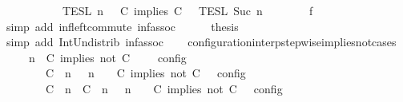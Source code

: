 \begin{isabellebody}
\ \ \ \ \ \ \ \ {\isasyminter}\ {\isacharparenleft}{\isasymlbrakk}{\isasymlbrakk}\ {\isasymPsi}\ {\isasymrbrakk}{\isasymrbrakk}\isactrlsub T\isactrlsub E\isactrlsub S\isactrlsub L\isactrlbsup {\isasymge}\ n\isactrlesup \ {\isasyminter}\ {\isasymlbrakk}{\isasymlbrakk}\ {\isacharparenleft}C\ implies\ C\ {\isacharhash}\ {\isasymPhi}\ {\isasymrbrakk}{\isasymrbrakk}\isactrlsub T\isactrlsub E\isactrlsub S\isactrlsub L\isactrlbsup {\isasymge}\ Suc\ n\isactrlesup {\isacharparenright}{\isacartoucheclose}\isanewline
\ \ \ \ \ \ \isamarkupfalse%
\ f{}\ \isamarkupfalse%
\ {\isacharparenleft}simp\ add{\isacharcolon}\ inf{\isacharunderscore}left{\isacharunderscore}commute\ inf{\isacharunderscore}assoc{\isacharparenright}\isanewline
\ \ \ \ \isamarkupfalse%
\ {\isacharquery}thesis\ \isamarkupfalse%
\ {\isacharparenleft}simp\ add{\isacharcolon}\ Int{\isacharunderscore}Un{\isacharunderscore}distrib{}\ inf{\isacharunderscore}assoc{\isacharparenright}\isanewline
\ \ \isamarkupfalse%
\isanewline
{}\isamarkupfalse%
%
\endisatagproof
{\isafoldproof}%
%
\isadelimproof
\isanewline
%
\endisadelimproof
\isanewline
{}\isamarkupfalse%
\ configuration{\isacharunderscore}interp{\isacharunderscore}stepwise{\isacharunderscore}implies{\isacharunderscore}not{\isacharunderscore}cases{\isacharcolon}\isanewline
\ \ \ {\isacartoucheopen}{\isasymlbrakk}\ {\isasymGamma}{\isacharcomma}\ n\ {\isasymturnstile}\ {\isacharparenleft}{\isacharparenleft}C\ implies\ not\ C\ {\isacharhash}\ {\isasymPsi}{\isacharparenright}\ {\isasymtriangleright}\ {\isasymPhi}\ {\isasymrbrakk}\isactrlsub c\isactrlsub o\isactrlsub n\isactrlsub f\isactrlsub i\isactrlsub g\isanewline
\ \ \ \ \ \ {\isacharequal}\ {\isasymlbrakk}\ {\isacharparenleft}{\isacharparenleft}C\ {\isasymnot}{\isasymUp}\ n{\isacharparenright}\ {\isacharhash}\ {\isasymGamma}{\isacharparenright}{\isacharcomma}\ n\ {\isasymturnstile}\ {\isasymPsi}\ {\isasymtriangleright}\ {\isacharparenleft}{\isacharparenleft}C\ implies\ not\ C\ {\isacharhash}\ {\isasymPhi}{\isacharparenright}\ {\isasymrbrakk}\isactrlsub c\isactrlsub o\isactrlsub n\isactrlsub f\isactrlsub i\isactrlsub g\isanewline
\ \ \ \ \ \ {\isasymunion}\ {\isasymlbrakk}\ {\isacharparenleft}{\isacharparenleft}C\ {\isasymUp}\ n{\isacharparenright}\ {\isacharhash}\ {\isacharparenleft}C\ {\isasymnot}{\isasymUp}\ n{\isacharparenright}\ {\isacharhash}\ {\isasymGamma}{\isacharparenright}{\isacharcomma}\ n\ {\isasymturnstile}\ {\isasymPsi}\ {\isasymtriangleright}\ {\isacharparenleft}{\isacharparenleft}C\ implies\ not\ C\ {\isacharhash}\ {\isasymPhi}{\isacharparenright}\ {\isasymrbrakk}\isactrlsub c\isactrlsub o\isactrlsub n\isactrlsub f\isactrlsub i\isactrlsub g{\isacartoucheclose}\isanewline

\end{isabellebody}
